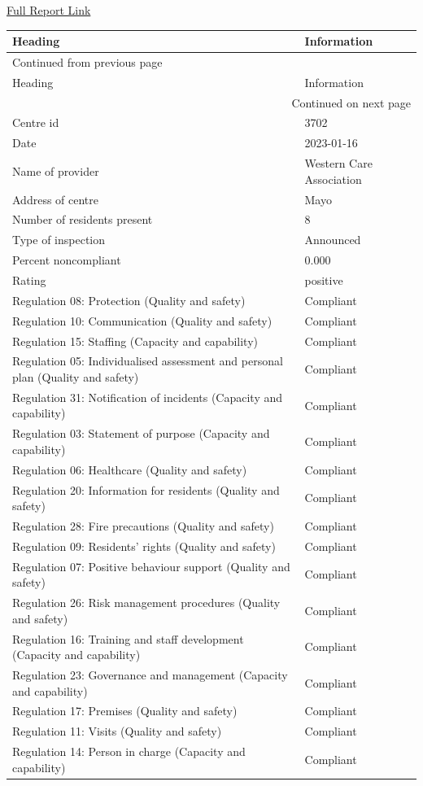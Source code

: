 \documentclass[a4paper,11pt,twoside]{article}
\begin{document}
\href{https://www.hiqa.ie/system/files?file=inspectionreports/3702-mountain-view-residential-respite-services-16-january-2023.pdf}{Full Report Link}

\begin{longtable}{p{11cm}|p{5cm}}
Heading & Information\\[0pt]
\hline
\endfirsthead
\multicolumn{2}{l}{Continued from previous page} \\[0pt]
\hline

Heading & Information \\[0pt]

\hline
\endhead
\hline\multicolumn{2}{r}{Continued on next page} \\
\endfoot
\endlastfoot
\hline
Centre id & 3702\\[0pt]
Date & 2023-01-16\\[0pt]
Name of provider & Western Care Association\\[0pt]
Address of centre & Mayo\\[0pt]
Number of residents present & 8\\[0pt]
Type of inspection & Announced\\[0pt]
Percent noncompliant & 0.000\\[0pt]
Rating & positive\\[0pt]
Regulation 08: Protection (Quality and safety) & Compliant\\[0pt]
Regulation 10: Communication (Quality and safety) & Compliant\\[0pt]
Regulation 15: Staffing (Capacity and capability) & Compliant\\[0pt]
Regulation 05: Individualised assessment and personal plan (Quality and safety) & Compliant\\[0pt]
Regulation 31: Notification of incidents (Capacity and capability) & Compliant\\[0pt]
Regulation 03: Statement of purpose (Capacity and capability) & Compliant\\[0pt]
Regulation 06: Healthcare (Quality and safety) & Compliant\\[0pt]
Regulation 20: Information for residents (Quality and safety) & Compliant\\[0pt]
Regulation 28: Fire precautions (Quality and safety) & Compliant\\[0pt]
Regulation 09: Residents' rights (Quality and safety) & Compliant\\[0pt]
Regulation 07: Positive behaviour support (Quality and safety) & Compliant\\[0pt]
Regulation 26: Risk management procedures (Quality and safety) & Compliant\\[0pt]
Regulation 16: Training and staff development (Capacity and capability) & Compliant\\[0pt]
Regulation 23: Governance and management (Capacity and capability) & Compliant\\[0pt]
Regulation 17: Premises (Quality and safety) & Compliant\\[0pt]
Regulation 11: Visits (Quality and safety) & Compliant\\[0pt]
Regulation 14: Person in charge (Capacity and capability) & Compliant\\[0pt]
\end{longtable}
\end{document}
